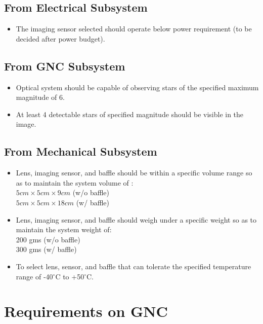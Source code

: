 \subsection{From Electrical Subsystem}
\begin{itemize}
    \item The imaging sensor selected should operate below power requirement (to be decided after power budget).
    
\end{itemize}
\subsection{From GNC Subsystem}
\begin{itemize}
    \item Optical system should be capable of observing stars of the specified maximum magnitude of 6.
    \item At least 4 detectable stars of specified magnitude should be visible in the image.
\end{itemize}

\subsection{From Mechanical Subsystem}
\begin{itemize}
    \item Lens, imaging sensor, and baffle should be within a specific volume range so as to maintain the system volume of : \\$5cm\times5cm\times9cm$ (w/o baffle) \\$5cm\times5cm\times18cm$ (w/ baffle)
    \item Lens, imaging sensor, and baffle should weigh under a specific weight so as to maintain the system weight of:\\200 gms (w/o baffle)\\300 gms (w/ baffle)
    \item To select lens, sensor, and baffle that can tolerate the specified temperature range of -40$^\circ$C to +50$^\circ$C. 
\end{itemize}


\newpage
\section{Requirements on GNC}
